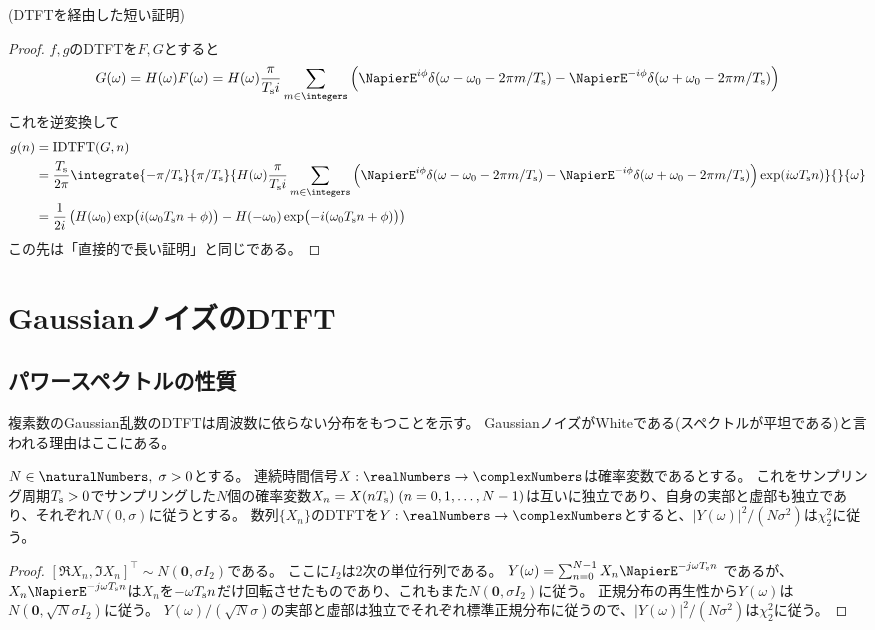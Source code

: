         (DTFTを経由した短い証明)
        \begin{proof}
            \quad\par
            $f,g$のDTFTを$F,G$とすると
            \[ G(\omega) = H(\omega)F(\omega) = H(\omega)\frac{\pi}{\Ts i}\sum_{m\in\integers}\left(\NapierE^{i\phi}\delta(\omega-\omega_0 - 2\pi m/\Ts) - \NapierE^{-i\phi}\delta(\omega+\omega_0 - 2\pi m/\Ts)\right) \]
            これを逆変換して
            \begin{align*}
                g(n) &= \text{IDTFT}(G,n) \\
                &= \frac{\Ts}{2\pi}\integrate{-\pi/\Ts}{\pi/\Ts}{H(\omega)\frac{\pi}{\Ts i}\sum_{m\in\integers}\left(\NapierE^{i\phi}\delta(\omega-\omega_0 - 2\pi m/\Ts) - \NapierE^{-i\phi}\delta(\omega+\omega_0 - 2\pi m/\Ts)\right)\exp(i\omega\Ts n)}{}{\omega} \\
                &= \frac{1}{2i}\left(H(\omega_0)\exp\bigl(i(\omega_0\Ts n+\phi)\bigr) - H(-\omega_0)\exp\bigl(-i(\omega_0\Ts n+\phi)\bigr)\right)
            \end{align*}
            この先は「直接的で長い証明」と同じである。
        \end{proof}
    \section{GaussianノイズのDTFT}
        \subsection{パワースペクトルの性質}
            \label{GaussianノイズのDTFTのパワースペクトル}
            複素数のGaussian乱数のDTFTは周波数に依らない分布をもつことを示す。
            GaussianノイズがWhiteである(スペクトルが平坦である)と言われる理由はここにある。
            \begin{shadebox}
                $N\in\naturalNumbers,\;\sigma>0$とする。
                連続時間信号$X:\realNumbers\to\complexNumbers$は確率変数であるとする。
                これをサンプリング周期$T_\text{s}>0$でサンプリングした$N$個の確率変数$X_n = X(nT_\text{s})\;(n=0,1,\dots,N-1)$は互いに独立であり、自身の実部と虚部も独立であり、それぞれ$N(0,\sigma)$に従うとする。
                数列$\{X_n\}$のDTFTを$Y:\realNumbers\to\complexNumbers$とすると、$|Y(\omega)|^2/(N\sigma^2)$は$\chi_2^2$に従う。
            \end{shadebox}
            \begin{proof}
                \quad\par
                $[\Re{X_n}, \Im{X_n}]^\top \sim N(\bm{0}, \sigma I_2)$である。
                ここに$I_2$は2次の単位行列である。
                $Y(\omega) = \sum_{n=0}^{N-1} X_n \NapierE^{-j\omega\Ts n}$
                であるが、$X_n \NapierE^{-j\omega\Ts n}$は$X_n$を$-\omega T_\text{s} n$だけ回転させたものであり、これもまた$N(\bm{0}, \sigma I_2)$に従う。
                正規分布の再生性から$Y(\omega)$は$N(\bm{0}, \sqrt{N}\sigma I_2)$に従う。
                $Y(\omega)/(\sqrt{N}\sigma)$の実部と虚部は独立でそれぞれ標準正規分布に従うので、$|Y(\omega)|^2/(N\sigma^2)$は$\chi_2^2$に従う。
            \end{proof}

